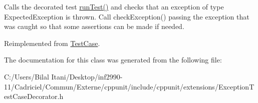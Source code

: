 Calls the decorated test \hyperlink{class_exception_test_case_decorator_a3f78294d459a94f55413162d814f291d}{run\+Test()} and checks that an exception of type Expected\+Exception is thrown. Call check\+Exception() passing the exception that was caught so that some assertions can be made if needed. 

Reimplemented from \hyperlink{class_test_case_a6b55957ac1dfef01e5d9fa2475676f34}{Test\+Case}.



The documentation for this class was generated from the following file\+:\begin{DoxyCompactItemize}
\item 
C\+:/\+Users/\+Bilal Itani/\+Desktop/inf2990-\/11/\+Cadriciel/\+Commun/\+Externe/cppunit/include/cppunit/extensions/Exception\+Test\+Case\+Decorator.\+h\end{DoxyCompactItemize}
